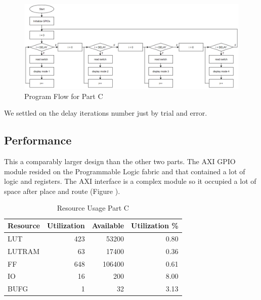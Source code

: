 \documentclass[letterpaper, 10 pt, conference]{IEEEconf}  %
\begin{document}
\begin{figure}[thpb]
   \centering
   \parbox{3in}{\centering\includegraphics[scale=0.2]{img/program_flow_chart.PNG}}
   \caption{Program Flow for Part C}
   \label{figurelabel}
\end{figure}

We settled on the delay iterations number just by trial and error.

\subsection{Performance}
This a comparably larger design than the other two parts. The AXI GPIO module resided on the Programmable Logic fabric and that contained a lot of logic and registers. The AXI interface is a complex module so it occupied a lot of space after place and route (Figure ).

\begin{table}[H]
\centering
\caption{Resource Usage Part C}
\label{table_example}
\begin{tabular}{|l|r|r|r|}
\hline
\rowcolor[HTML]{EFEFEF} 
Resource & \multicolumn{1}{l|}{\cellcolor[HTML]{EFEFEF}Utilization} & \multicolumn{1}{l|}{\cellcolor[HTML]{EFEFEF}Available} & \multicolumn{1}{l|}{\cellcolor[HTML]{EFEFEF}Utilization \%} \\ \hline
LUT      & 423                                                        & 53200                                                  & 0.80                                                        \\ \hline
LUTRAM   & 63                                                        & 17400 & 0.36                                                        \\ \hline

FF       & 648                                                       & 106400                                                 & 0.61                                                        \\ \hline
IO       & 16                                                       & 200                                                    & 8.00                                                        \\ \hline
BUFG     & 1                                                        & 32                                                     & 3.13                                                        \\ \hline
\end{tabular}
\end{table}
\end{document}
